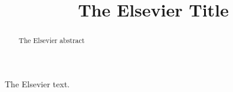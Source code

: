 \documentclass[3p]{elsarticle}   %
\begin{document}
\begin{frontmatter}
 \title{The Elsevier Title}



  \begin{abstract}
The Elsevier abstract
  \end{abstract}
\end{frontmatter}

The Elsevier text.
\end{document}
